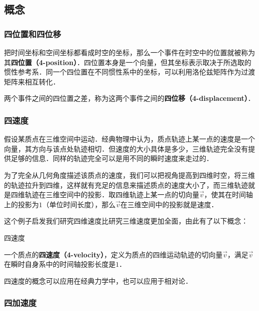 

\subsection{概念}
\subsubsection{四位置和四位移}
把时间坐标和空间坐标都看成时空的坐标，那么一个事件在时空中的位置就被称为其\textbf{四位置（4-position）}．四位置本身是一个向量，但其坐标表示取决于所选取的惯性参考系．同一个四位置在不同惯性系中的坐标，可以利用洛伦兹矩阵作为过渡矩阵来相互转化．

两个事件之间的四位置之差，称为这两个事件之间的\textbf{四位移（4-displacement）}．

\subsubsection{四速度}

假设某质点在三维空间中运动．经典物理中认为，质点轨迹上某一点的速度是一个向量，其方向与该点处轨迹相切．但速度的大小具体是多少，三维轨迹完全没有提供足够的信息．同样的轨迹完全可以是用不同的瞬时速度来走过的．

为了完全从几何角度描述该质点的速度，我们可以把视角提高到四维时空，将三维的轨迹拉升到四维，这样就有充足的信息来描述质点的速度大小了，而三维轨迹就是四维轨迹在三维空间中的投影．取四维轨迹上某一点的切向量$\vec{v}$，使其在时间轴上的投影为$1$（单位时间长度），那么$\vec{v}$在三维空间中的投影就是速度．

这个例子启发我们研究四维速度比研究三维速度更加全面，由此有了以下概念：

\begin{definition}{四速度}

一个质点的\textbf{四速度（4-velocity）}，定义为质点的四维运动轨迹的切向量$\vec{v}$，满足$\vec{v}$在瞬时自身系中的时间轴投影长度是$1$．

\end{definition}

四速度的概念可以应用在经典力学中，也可以应用于相对论．

\subsubsection{四加速度}

